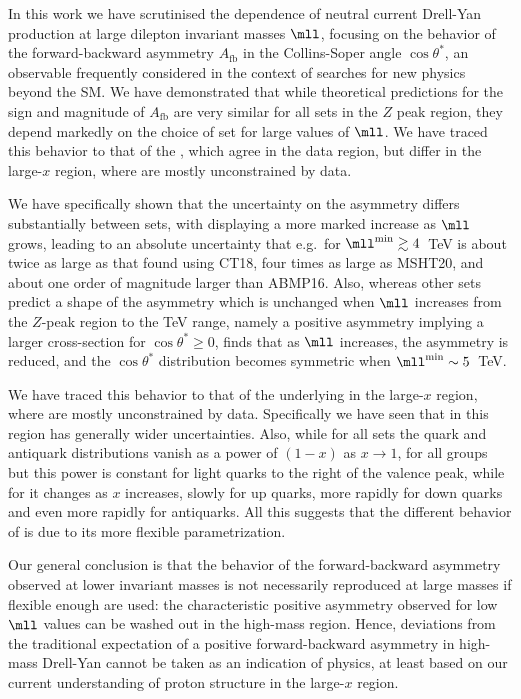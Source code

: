 
In this work we have scrutinised the \pdf dependence of  neutral current
Drell-Yan production
at large dilepton invariant masses $\mll$, focusing on the behavior
of the forward-backward asymmetry $A_{\text{fb}}$
in the Collins-Soper angle $\cos\theta^*$, an observable frequently
considered in the context of searches for new physics beyond the SM.
%
We have demonstrated that while theoretical
predictions for the sign and magnitude of $A_{\text{fb}}$ are very
similar for all \pdf sets in the
$Z$ peak region, they
depend markedly on the choice of \pdf set for  large values of $\mll$. 
We have traced this behavior to that of the \pdfs, which agree in the
data region, but differ in the large-$x$
region, where \pdfs are mostly unconstrained by data.

We have specifically shown that the uncertainty on the asymmetry
differs substantially between \pdf sets, with  displaying
a more marked increase as  $\mll$ grows, leading to
an absolute uncertainty that e.g.\ for $\mll^{\text{min}}\gtrsim4$~TeV
is about twice as large as that found using CT18, 
four times as large as MSHT20,
and about one order of magnitude larger than ABMP16.
%
Also, whereas other \pdf sets predict a shape of the asymmetry
which is unchanged when  $\mll$ increases from the $Z$-peak region to
the TeV range, namely a 
positive
asymmetry implying a larger cross-section  for $\cos\theta^*\ge 0$,  finds that as
$\mll$ increases, the asymmetry is reduced, and the $\cos\theta^*$ distribution
becomes symmetric when $\mll^{\text{min}}\sim5$~TeV.

We have traced this behavior to that of the underlying
\pdfs in the large-$x$ region, where \pdfs are mostly unconstrained by
data.
%
Specifically we have seen that in this region  has
generally wider uncertainties.
%
Also, while for  all \pdf  sets the
quark and antiquark distributions vanish as
a power of $(1-x)$ as $x\to 1$, for all groups but  this power is
constant for light quarks to the right of the valence peak, while for
 it changes as $x$ increases, slowly for up quarks, more rapidly
for down quarks and even more rapidly for antiquarks.
%
All this suggests that the different behavior of
 is due to its more flexible \pdf parametrization.

Our general conclusion is that the 
behavior of the forward-backward asymmetry
observed at lower invariant masses is not necessarily reproduced at
large masses if flexible enough
\pdfs are used:  the characteristic positive asymmetry observed
for low $\mll$ values
can be washed out in the high-mass region.
%
Hence, deviations from the traditional expectation of a positive forward-backward
asymmetry in high-mass Drell-Yan cannot be taken as an indication of 
\bsm physics,
at least based on  our current understanding of proton structure in the large-$x$ region.

